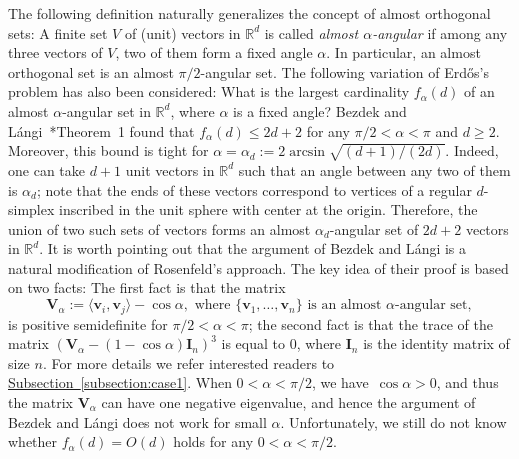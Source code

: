 \documentclass[a4paper, oneside, reqno, 12pt]{amsart}
\theoremstyle{plain}
\theoremstyle{definition}
\begin{document}
The following definition naturally generalizes the concept of almost orthogonal sets: A finite set $V$ of (unit) vectors in $\mathbb R^d$ is called \textit{almost $\alpha$-angular} if among any three vectors of $V$, two of them form a fixed angle $\alpha$. In particular, an almost orthogonal set is an almost $\pi/2$-angular set. The following variation of Erd\H{o}s's problem has also been considered: What is the largest cardinality $f_{\alpha}(d)$ of an almost $\alpha$-angular set in $\mathbb R^d$, where $\alpha$ is a fixed angle? Bezdek and L{\'a}ngi~\cite{BL00}*{Theorem~1} found that $f_{\alpha}(d)\leq 2d+2$ for any $\pi/2<\alpha<\pi$ and $d\geq 2$. Moreover, this bound is tight for $\alpha=\alpha_d:=2\arcsin \sqrt{(d+1)/(2d)}$. Indeed, one can take $d+1$ unit vectors in $\mathbb R^d$ such that an angle between any two of them is $\alpha_d$; note that the ends of these vectors correspond to vertices of a regular $d$-simplex inscribed in the unit sphere with center at the origin. Therefore, the union of two such sets of vectors forms an almost $\alpha_d$-angular set of $2d+2$ vectors in $\mathbb R^d$. It is worth pointing out that the argument of Bezdek and L{\'a}ngi is a natural modification of Rosenfeld's approach. The key idea of their proof is based on two facts: The first fact is that the matrix
\[
\mathbf V_{\alpha}:=\langle\mathbf v_i, \mathbf v_j\rangle - \cos \alpha,\text{ where } \{\mathbf v_1, \dots, \mathbf v_n\} \text{ is an almost $\alpha$-angular set},
\]
is positive semidefinite for $\pi/2< \alpha< \pi$; the second fact is that the trace of the matrix $(\mathbf V_{\alpha} - (1-\cos \alpha)\mathbf I_n)^3$ is equal to $0$, where $\mathbf I_n$ is the identity matrix of size $n$. For more details we refer interested readers to \hyperref[subsection:case1]{Subsection~\ref*{subsection:case1}}. When $0<\alpha<\pi/2$, we have~$\cos \alpha>0$, and thus the matrix $\mathbf V_\alpha$ can have one negative eigenvalue, and hence the argument of Bezdek and L{\'a}ngi does not work for small $\alpha$. Unfortunately, we still do not know whether $f_{\alpha}(d)=O(d)$ holds for any $0<\alpha<\pi/2$.
\end{document}
